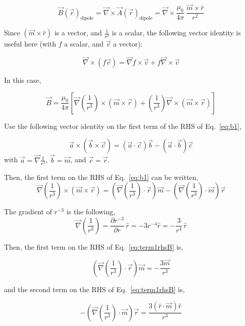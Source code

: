 \documentclass[12pt]{article}
\begin{document}
\begin{flushleft}
\[
\vec{B}(\vec{r})_{\text{dipole}} = \vec{\nabla} \times \vec{A}(\vec{r})_{\text{dipole}} = \vec{\nabla} \times \frac{\mu_{0}}{4\pi}  \: \frac{\vec{m} \times \hat{r}}{r^{2}}
\]

Since $(\vec{m} \times \hat{r})$ is a vector, and $\frac{1}{r^{3}}$ is a scalar, the following vector identity is useful here (with $f$ a scalar, and $\vec{v}$ a vector):

\[
\vec{\nabla} \times (f\vec{v}) = \vec{\nabla}f \times \vec{v} + f\vec{\nabla} \times \vec{v}
\]

In this case,

\begin{equation}
\vec{B} = \frac{\mu_{0}}{4\pi}\left[ \vec{\nabla}\left( \frac{1}{r^{3}}\right) \times (\vec{m} \times \vec{r})  + \left( \frac{1}{r^{3}}\right)\vec{\nabla} \times (\vec{m} \times \vec{r}) \right]
\label{eq:b1}
\end{equation}

Use the following vector identity on the first term of the RHS of Eq.~\ref{eq:b1},

\[
\vec{a} \times (\vec{b} \times \vec{c}) = (\vec{a}\cdot\vec{c})\vec{b} - (\vec{a}\cdot\vec{b})\vec{c}
\]
with $\vec{a}=\vec{\nabla}\frac{1}{r^{3}}$, $\vec{b}=\vec{m}$, and $\vec{c}=\vec{r}$.

Then, the first term on the RHS of Eq.~\ref{eq:b1} can be written,
\begin{equation}
\vec{\nabla}\left( \frac{1}{r^{3}}\right) \times (\vec{m} \times \vec{r}) = \left(\vec{\nabla}\left(\frac{1}{r^{3}}\right) \cdot \vec{r} \right) \vec{m} - \left(\vec{\nabla}\left(\frac{1}{r^{3}}\right) \cdot \vec{m} \right) \vec{r}
\label{eq:term1rhsB}
\end{equation}

The gradient of $r^{-3}$ is the following,
\[
\vec{\nabla}\left( \frac{1}{r^{3}}\right) = \frac{\partial r^{-3}}{\partial r} \, \hat{r} = -3r^{-4}\hat{r} = -\frac{3}{r^{4}}\, \hat{r}
\]

\vspace{.1in}
Then, the first term on the RHS of Eq.~\ref{eq:term1rhsB} is, 

\[
\left(\vec{\nabla}\left(\frac{1}{r^{3}}\right) \cdot \vec{r} \right) \vec{m} = -\frac{3\vec{m}}{r^{3}}
\]

and the second term on the RHS of Eq.~\ref{eq:term1rhsB} is,

\[
- \left(\vec{\nabla}\left(\frac{1}{r^{3}}\right) \cdot \vec{m} \right) \vec{r} = \frac{3(\hat{r} \cdot \vec{m})\hat{r}}{r^{3}}
\]


\end{flushleft}
\end{document}
